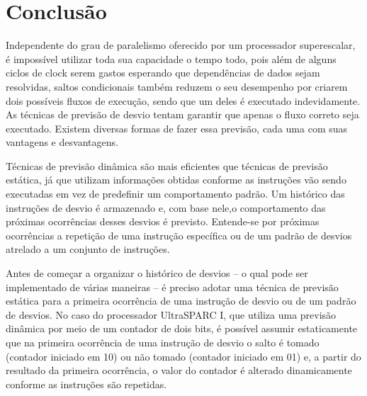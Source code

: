 \documentclass[12pt]{article}
\begin{document}
  \section{Conclusão}
  
  Independente do grau de paralelismo oferecido por um processador superescalar, é impossível utilizar toda sua capacidade o tempo todo, pois além de alguns
  ciclos de clock serem gastos esperando que dependências de dados sejam resolvidas, saltos condicionais também reduzem o seu desempenho por criarem dois
  possíveis fluxos de execução, sendo que um deles é executado indevidamente. As técnicas de previsão de desvio tentam garantir que apenas o fluxo correto seja
  executado. Existem diversas formas de fazer essa previsão, cada uma com suas vantagens e desvantagens. 
  
  Técnicas de previsão dinâmica são mais eficientes que técnicas de previsão estática, já que utilizam informações obtidas conforme as instruções vão sendo
  executadas em vez de predefinir um comportamento padrão. Um histórico das instruções de desvio é armazenado e, com base nele,o comportamento das próximas
  ocorrências desses desvios é previsto. Entende-se por próximas ocorrências a repetição de uma instrução específica ou de um padrão de desvios atrelado a um
  conjunto de instruções.
  
  Antes de começar a organizar o histórico de desvios -- o qual pode ser implementado de várias maneiras -- é preciso adotar uma técnica de previsão estática
  para a primeira ocorrência de uma instrução de desvio ou de um padrão de desvios. No caso do processador UltraSPARC I, que utiliza uma previsão dinâmica por
  meio de um contador de dois bits, é possível assumir estaticamente que na primeira ocorrência de uma instrução de desvio o salto é tomado (contador
  iniciado em 10) ou não tomado (contador iniciado em 01) e, a partir do resultado da primeira ocorrência, o valor do contador é alterado dinamicamente conforme as instruções são
  repetidas.
  
  \nocite{ultrasparc1}
  \nocite{loadstore}
  
  
\end{document}
